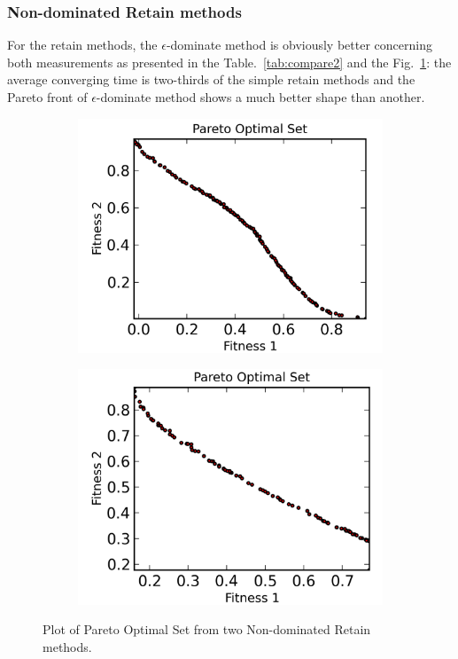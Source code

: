 \documentclass[11pt, runningheads,a4paper]{llncs}
\begin{document}
\subsubsection{Non-dominated Retain methods}
For the retain methods,  the $\epsilon$-dominate method is obviously better concerning both measurements as presented in the Table.~\ref{tab:compare2}  and the Fig.~\ref{fig:retain}: the average converging time is two-thirds of the simple retain methods and the Pareto front of $\epsilon$-dominate method shows a much better shape than another.
\begin{figure}
        \centering
        \begin{subfigure}[b]{0.4\textwidth}
                \centering
                \includegraphics[width=\textwidth]{./figs/simpleretain.png}
        \end{subfigure}
        \begin{subfigure}[b]{0.4\textwidth}
                \centering
                \includegraphics[width=\textwidth]{./figs/edominance.png}
        \end{subfigure}
        \caption{Plot of Pareto Optimal Set from two Non-dominated Retain methods.}\label{fig:retain}
\end{figure}
\end{document}
